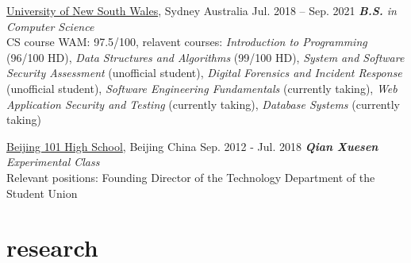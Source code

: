 \documentclass[hidelinks__VERSION__]{adamyi-cv}
\begin{document}
\begin{entrylist}


\entry
{\href{https://unsw.edu.au}{University of New South Wales}, Sydney Australia}
{Jul. 2018 -- Sep. 2021}
{\emph{\textbf{B.S.} in Computer Science}\\
CS course WAM: 97.5/100, relavent courses: \emph{Introduction to Programming} (96/100 HD), \emph{Data Structures and Algorithms} (99/100 HD), \emph{System and Software Security Assessment} (unofficial student), \emph{Digital Forensics and Incident Response} (unofficial student), \emph{Software Engineering Fundamentals} (currently taking), \emph{Web Application Security and Testing} (currently taking), \emph{Database Systems} (currently taking)
}

\entry
{\href{http://beijing101.com}{Beijing 101 High School}, Beijing China}
{Sep. 2012 - Jul. 2018}
{\emph{\textbf{Qian Xuesen} Experimental Class}\\
Relevant positions: Founding Director of the Technology Department of the Student Union
}

\end{entrylist}


\section{research}
\end{document}
